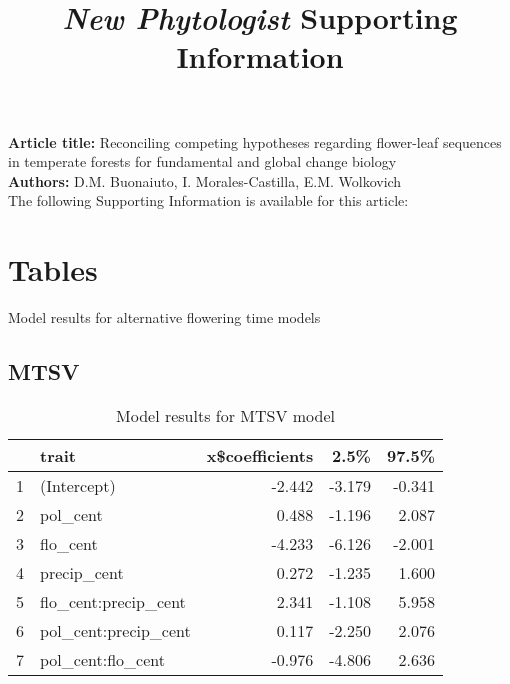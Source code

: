 \documentclass[11pt]{article}\usepackage[]{graphicx}\usepackage[]{color}
\title{\textit{New Phytologist} Supporting Information}
\date{}
\begin{document}
\maketitle

\noindent \textbf{Article title:} Reconciling competing hypotheses regarding flower-leaf sequences in temperate forests for fundamental and global change biology\\
\noindent \textbf{Authors:} D.M. Buonaiuto, I. Morales-Castilla, E.M. Wolkovich\\

\noindent The following Supporting Information is available for this article:\\

\section*{Tables}
Model results for alternative flowering time models

\subsection*{MTSV}
\begin{table}[H]
\centering
\begin{tabular}{rlrrr}
  \hline
 & trait & x\$coefficients & 2.5\% & 97.5\% \\ 
  \hline
1 & (Intercept) & -2.442 & -3.179 & -0.341 \\ 
  2 & pol\_cent & 0.488 & -1.196 & 2.087 \\ 
  3 & flo\_cent & -4.233 & -6.126 & -2.001 \\ 
  4 & precip\_cent & 0.272 & -1.235 & 1.600 \\ 
  5 & flo\_cent:precip\_cent & 2.341 & -1.108 & 5.958 \\ 
  6 & pol\_cent:precip\_cent & 0.117 & -2.250 & 2.076 \\ 
  7 & pol\_cent:flo\_cent & -0.976 & -4.806 & 2.636 \\ 
   \hline
\end{tabular}
\caption{Model results for MTSV model} 
\label{main_mtsv_physilogical}
\end{table}
\end{document}
